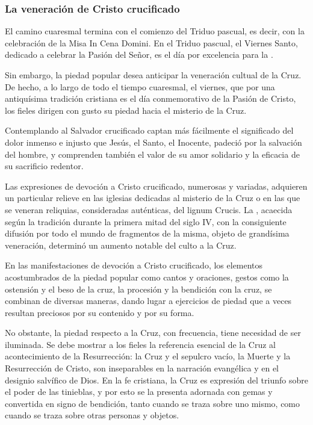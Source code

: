 \begin{introstyle}
\subsubsection{La veneración de Cristo crucificado}

El camino cuaresmal termina con el comienzo del Triduo pascual, es decir, con la celebración de la Misa In Cena Domini. En el Triduo pascual, el Viernes Santo, dedicado a celebrar la Pasión del Señor, es el día por excelencia para la .

Sin embargo, la piedad popular desea anticipar la veneración cultual de la Cruz. De hecho, a lo largo de todo el tiempo cuaresmal, el viernes, que por una antiquísima tradición cristiana es el día conmemorativo de la Pasión de Cristo, los fieles dirigen con gusto su piedad hacia el misterio de la Cruz.

Contemplando al Salvador crucificado captan más fácilmente el significado del dolor inmenso e injusto que Jesús, el Santo, el Inocente, padeció por la salvación del hombre, y comprenden también el valor de su amor solidario y la eficacia de su sacrificio redentor.

Las expresiones de devoción a Cristo crucificado, numerosas y variadas, adquieren un particular relieve en las iglesias dedicadas al misterio de la Cruz o en las que se veneran reliquias, consideradas auténticas, del lignum Crucis. La , acaecida según la tradición durante la primera mitad del siglo IV, con la consiguiente difusión por todo el mundo de fragmentos de la misma, objeto de grandísima veneración, determinó un aumento notable del culto a la Cruz.

En las manifestaciones de devoción a Cristo crucificado, los elementos acostumbrados de la piedad popular como cantos y oraciones, gestos como la ostensión y el beso de la cruz, la procesión y la bendición con la cruz, se combinan de diversas maneras, dando lugar a ejercicios de piedad que a veces resultan preciosos por su contenido y por su forma.

No obstante, la piedad respecto a la Cruz, con frecuencia, tiene necesidad de ser iluminada. Se debe mostrar a los fieles la referencia esencial de la Cruz al acontecimiento de la Resurrección: la Cruz y el sepulcro vacío, la Muerte y la Resurrección de Cristo, son inseparables en la narración evangélica y en el designio salvífico de Dios. En la fe cristiana, la Cruz es expresión del triunfo sobre el poder de las tinieblas, y por esto se la presenta adornada con gemas y convertida en signo de bendición, tanto cuando se traza sobre uno mismo, como cuando se traza sobre otras personas y objetos.


\end{introstyle}
